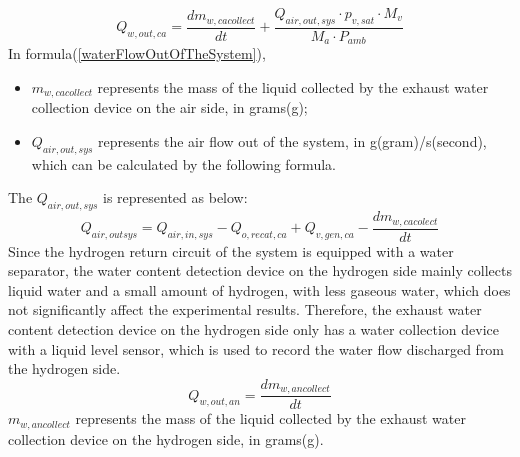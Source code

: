 \begin{equation}
	\label{waterFlowOutOfTheSystem}
	Q_{w,out,ca}={\frac{d m_{w,cacollect}}{d t}}+{\frac{Q_{air,out,sys} \cdot p_{v,sat}\cdot M_{v}}{M_{a} \cdot P_{a m b}}}
\end{equation}
In formula(\ref{waterFlowOutOfTheSystem}),
\begin{itemize}
	\item $m_{w,cacollect}$ represents the mass of the liquid collected by the exhaust water collection device on the air side, in grams(g);
	\item $Q_{air,out,sys}$ represents the air flow out of the system, in g(gram)/s(second), which can be calculated by the following formula.
\end{itemize}
The $Q_{air,out,sys}$ is represented as below:
\begin{equation}
	\label{airFlowOutOfTheSystem}
	Q_{air,outsys}=Q_{air,in,sys}-Q_{o,recat,ca}+Q_{v,gen,ca}-{\frac{dm_{w,cacolect}}{dt}}
\end{equation}
Since the hydrogen return circuit of the system is equipped with a water separator, the water content detection device on the hydrogen side mainly collects liquid water and a small amount of hydrogen, with less gaseous water, which does not significantly affect the experimental results. Therefore, the exhaust water content detection device on the hydrogen side only has a water collection device with a liquid level sensor, which is used to record the water flow discharged from the hydrogen side.
\begin{equation}
	Q_{w,out,an}={\frac{dm_{w,ancollect}}{dt}}
\end{equation}
$m_{w,ancollect}$ represents the mass of the liquid collected by the exhaust water collection device on the hydrogen side, in grams(g).


